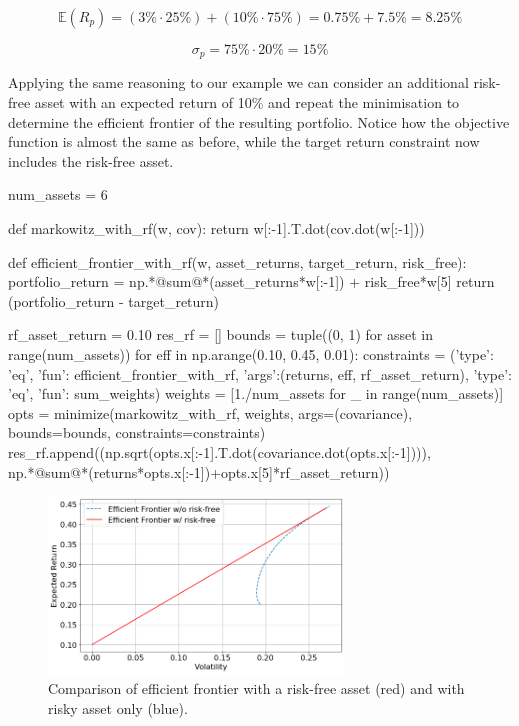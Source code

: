 \[ \mathbb{E}(R_p) = (3\% \cdot 25\%) + (10\% \cdot 75\%) = 0.75\% + 7.5\% = 8.25\% \]

\[ \sigma_p = 75\% \cdot 20\% = 15\% \]

Applying the same reasoning to our example we can consider an additional risk-free asset with an expected return of 10\% and repeat the minimisation to determine the efficient frontier of the resulting portfolio. Notice how the objective function is almost the same as before, while the target return constraint now includes the risk-free asset.

\begin{ipython}
num_assets = 6

def markowitz_with_rf(w, cov):
    return w[:-1].T.dot(cov.dot(w[:-1]))

def efficient_frontier_with_rf(w, asset_returns, target_return, risk_free):
    portfolio_return = np.*@sum@*(asset_returns*w[:-1]) + risk_free*w[5]
    return (portfolio_return - target_return)

rf_asset_return = 0.10
res_rf = []
bounds = tuple((0, 1) for asset in range(num_assets))
for eff in np.arange(0.10, 0.45, 0.01):
    constraints = ({'type': 'eq', 'fun': efficient_frontier_with_rf,
	                'args':(returns, eff, rf_asset_return)},
                   {'type': 'eq', 'fun': sum_weights})
    weights = [1./num_assets for _ in range(num_assets)]
    opts = minimize(markowitz_with_rf, weights, args=(covariance),
                    bounds=bounds, constraints=constraints)
    res_rf.append((np.sqrt(opts.x[:-1].T.dot(covariance.dot(opts.x[:-1]))),
                   np.*@sum@*(returns*opts.x[:-1])+opts.x[5]*rf_asset_return))
\end{ipython}

\begin{figure}[htb]
\centering
    \includegraphics[width=0.7\textwidth]{figures/cal}
    \caption{Comparison of efficient frontier with a risk-free asset (red) and with risky asset only (blue).}
    \label{fig:cal}
\end{figure}
    
